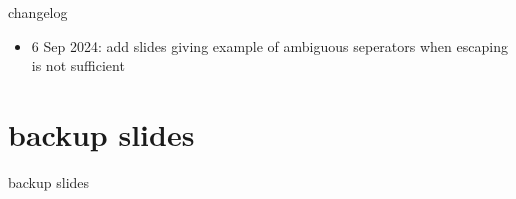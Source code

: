 \date{}
\title{}
\date{}

\begin{frame}
    \titlepage
\end{frame}

{\changelogmode
\begin{frame}{changelog}
\begin{itemize}
\item 6 Sep 2024: add slides giving example of ambiguous seperators when escaping is not sufficient
\end{itemize}
\end{frame}
}


\section{backup slides}
\begin{frame}{backup slides}
\end{frame}


